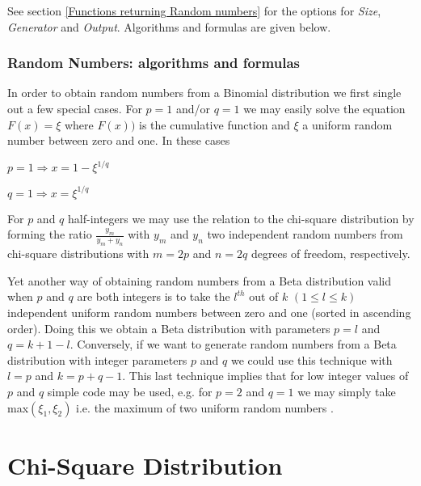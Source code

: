 \vspace{0.3cm}

See section \ref{Functions returning Random numbers} for the options for  {\itshape\sffamily Size},  {\itshape\sffamily Generator} and {\itshape\sffamily Output}. Algorithms and formulas are given below.

\subsubsection{Random Numbers: algorithms and formulas}
In order to obtain random numbers from a Binomial distribution we first single out a few special cases.
For $p = 1$ and/or $q = 1$ we may easily solve the equation $F(x) = \xi$ where $F(x))$ is the cumulative function and $\xi$ a uniform random number between zero and one. In these cases

\begin{center}
	
	$p = 1 \Rightarrow x = 1 - \xi^{1/q}$
	
	$q = 1 \Rightarrow x = \xi^{1/q}$
	
\end{center}


For $p$ and $q$ half-integers we may use the relation to the chi-square distribution by forming the ratio $\frac{y_m}{y_m + y_n}$ with $y_m$ and $y_n$ two independent random numbers from chi-square distributions with $m =2p$ and $n = 2q$ degrees of freedom, respectively.

Yet another way of obtaining random numbers from a Beta distribution valid when $p$ and $q$ are both integers is to take the $l^{th}$ out of $k$ $(1 \leq l \leq k)$ independent uniform random numbers between zero and one (sorted in ascending order). Doing this we obtain a Beta distribution with parameters $p = l$ and $q = k + 1 - l$. Conversely, if we want to generate random numbers from a Beta distribution with integer parameters $p$ and $q$ we could use this technique with $l = p$ and $k = p+q-1$. This last technique implies that for low integer
values of $p$ and $q$ simple code may be used, e.g. for $p = 2$ and $q = 1$ we may simply take max$(\xi_1, \xi_2)$ i.e. the maximum of two uniform random numbers \citep{walck_2007}.




\section{Chi-Square Distribution}
\label{ChiSquareDistribution}

